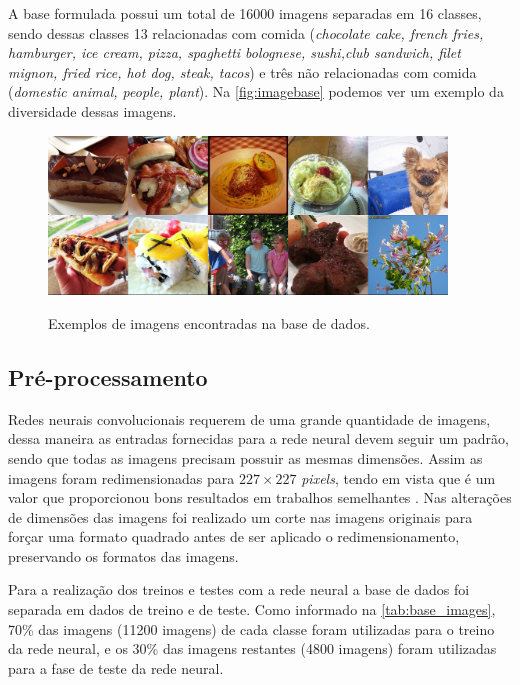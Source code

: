 \par A base formulada possui um total de 16000 imagens separadas em 16 classes, sendo dessas classes 13  relacionadas com comida (\textit{chocolate cake, french fries, hamburger, ice cream, pizza, spaghetti bolognese, sushi,club sandwich, filet mignon, fried rice, hot dog, steak, tacos}) e três não relacionadas com comida (\textit{domestic animal, people, plant}). Na \autoref{fig:imagebase} podemos ver um exemplo da diversidade dessas imagens.
\begin{figure}[H]
  \centering
  \caption{Exemplos de imagens encontradas na base de dados.}
  \includegraphics[width=300pt]{dados/figuras/imagembase}
  \label{fig:imagebase}
\end{figure}

\subsection{Pré-processamento}
\par Redes neurais convolucionais requerem de uma grande quantidade de imagens, dessa maneira as entradas fornecidas para a rede neural devem seguir um padrão, sendo que todas as imagens precisam possuir as mesmas dimensões. Assim as imagens foram redimensionadas para $227\times227$ \textit{pixels}, tendo em vista que é um valor que proporcionou bons resultados em trabalhos semelhantes \cite{imaginetArticle}. Nas alterações de dimensões das imagens foi realizado um corte nas imagens originais para forçar uma formato quadrado antes de ser aplicado o redimensionamento, preservando os formatos das imagens.

\par Para a realização dos treinos e testes com a rede neural a base de dados foi separada em dados de treino e de teste. Como informado na \autoref{tab:base_images}, 70\% das imagens (11200 imagens) de cada classe foram utilizadas para o treino da rede neural, e os 30\% das imagens restantes (4800 imagens) foram utilizadas para a fase de teste da rede neural.

